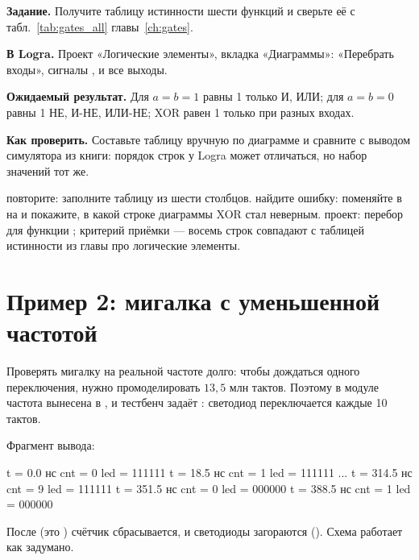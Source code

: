 \begin{diybox}
\textbf{Задание.} Получите таблицу истинности шести функций и сверьте её с табл.~\ref{tab:gates_all} главы~\ref{ch:gates}.

\textbf{В Logra.} Проект «Логические элементы», вкладка «Диаграммы»: «Перебрать входы», сигналы ,  и все выходы.

\textbf{Ожидаемый результат.} Для $a=b=1$ равны 1 только И, ИЛИ; для $a=b=0$ равны 1 НЕ, И-НЕ, ИЛИ-НЕ; XOR равен 1 только при разных входах.

\textbf{Как проверить.} Составьте таблицу вручную по диаграмме и сравните с выводом симулятора из книги: порядок строк у Logra может отличаться, но набор значений тот же.

 повторите: заполните таблицу из шести столбцов.  найдите ошибку: поменяйте в  \code{\textasciicircum} на \code{|} и покажите, в какой строке диаграммы XOR стал неверным.  проект: перебор для функции ; критерий приёмки --- восемь строк совпадают с таблицей истинности из главы про логические элементы.
\end{diybox}

\section{Пример 2: мигалка с уменьшенной частотой}

Проверять мигалку на реальной частоте долго: чтобы дождаться одного
переключения, нужно промоделировать $13{,}5$ млн тактов. Поэтому в модуле
 частота вынесена в , и тестбенч задаёт
: светодиод переключается каждые 10 тактов.


Фрагмент вывода:
\begin{vcode}[text]
t =    0.0 нс  cnt =  0  led = 111111
t =   18.5 нс  cnt =  1  led = 111111
...
t =  314.5 нс  cnt =  9  led = 111111
t =  351.5 нс  cnt =  0  led = 000000
t =  388.5 нс  cnt =  1  led = 000000
\end{vcode}

После  (это ) счётчик сбрасывается, и
светодиоды загораются (). Схема работает как задумано.

